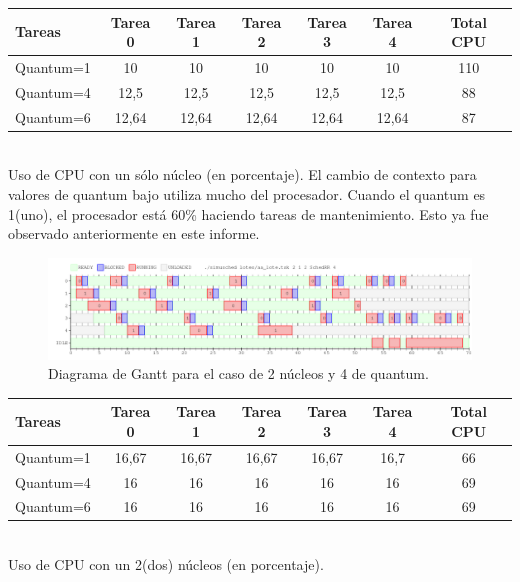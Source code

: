 \begin{center}
  \begin{tabular}{ |l | c | c | c | c| c|c|}
    \hline
    Tareas    & Tarea 0 & Tarea 1 & Tarea 2 & Tarea 3 & Tarea 4 & Total CPU  \\ \hline
    Quantum=1 & 10      & 10      & 10      & 10      &  10 & 110       \\ \hline
    Quantum=4 & 12,5    & 12,5    & 12,5    & 12,5    &  12,5 & 88        \\ \hline
    Quantum=6 & 12,64   & 12,64   & 12,64   & 12,64   &  12,64 & 87        \\ \hline
  \end{tabular} \\ \vspace{10pt} 
  Uso de CPU con un sólo núcleo (en porcentaje). El cambio de contexto para valores de quantum bajo utiliza mucho del procesador. Cuando el quantum es 1(uno), el procesador está 60\% haciendo tareas de mantenimiento. Esto ya fue observado anteriormente en este informe.
\end{center}

\begin{figure}[H]
	\includegraphics[scale=0.49]{ej7/ej7_2_4.png}
	\caption{Diagrama de Gantt para el caso de 2 núcleos y 4 de quantum.}
\end{figure}

\begin{center}
  \begin{tabular}{ |l | c | c | c | c| c | c|}
    \hline
    Tareas    & Tarea 0 & Tarea 1 & Tarea 2 & Tarea 3 & Tarea 4 & Total CPU  \\ \hline
    Quantum=1 & 16,67      & 16,67      & 16,67      & 16,67      & 16,7 &  66       \\ \hline
    Quantum=4 & 16    & 16    & 16    & 16    &  16 & 69        \\ \hline
    Quantum=6 & 16   & 16   & 16   & 16   &  16 & 69        \\ \hline
  \end{tabular} \\ \vspace{10pt} 
  Uso de CPU con un 2(dos) núcleos (en porcentaje).
\end{center}

